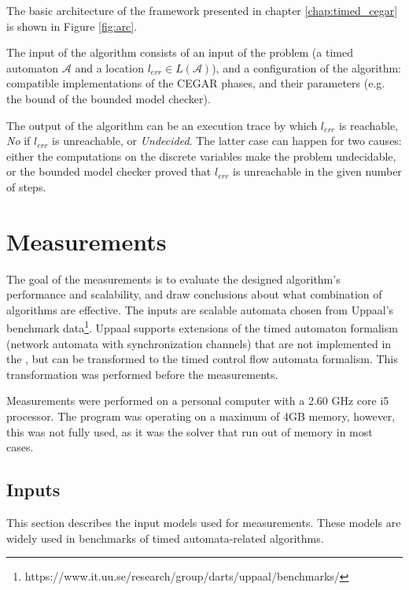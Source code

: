 The basic architecture of the framework presented in chapter \ref{chap:timed_cegar} is shown in Figure \ref{fig:arc}.

The input of the algorithm consists of an input of the problem (a timed automaton $\mathcal{A}$ and a location $l_{err} \in L(\mathcal{A})$), and a configuration of the algorithm: compatible implementations of the CEGAR phases, and their parameters (e.g. the bound of the bounded model checker).

The output of the algorithm can be an execution trace by which $l_{err}$ is reachable, \emph{No} if $l_{err}$ is unreachable, or \emph{Undecided}. The latter case can happen for two causes: either the computations on the discrete variables make the problem undecidable, or the bounded model checker proved that $l_{err}$ is unreachable in the given number of steps. 



\section{Measurements}

The goal of the measurements is to evaluate the designed algorithm's performance and scalability, and draw conclusions about what combination of algorithms are effective. The inputs are scalable automata chosen from Uppaal's benchmark data\footnote{https://www.it.uu.se/research/group/darts/uppaal/benchmarks/}. Uppaal supports extensions of the timed automaton formalism (network automata with synchronization channels) that are not implemented in the \ttmcfw, but can be transformed to the timed control flow automata formalism. This transformation was performed before the measurements.

Measurements were performed on a personal computer with a 2.60 GHz core i5 processor. The program was operating on a maximum of 4GB memory, however, this was not fully used, as it was the solver that run out of memory in most cases.

\subsection{Inputs}

This section describes the input models used for measurements. These models are widely used in benchmarks of timed automata-related algorithms.

